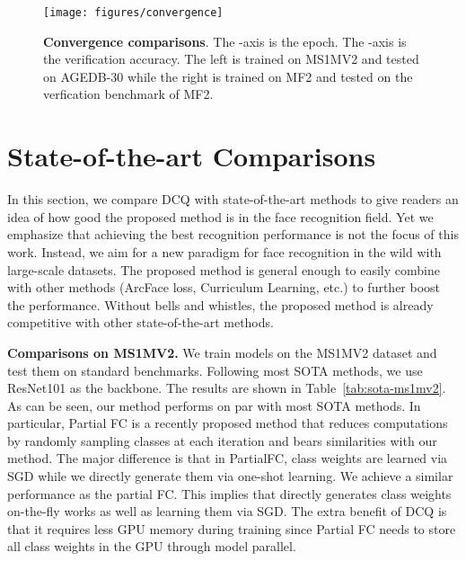 \documentclass[10pt,twocolumn,letterpaper]{article}
\begin{document}
\begin{figure}[h]
   \centering
   \texttt{[image: figures/convergence]}
   \caption{\textbf{Convergence comparisons}. The -axis is the epoch. The -axis is the verification accuracy. The left is trained on MS1MV2 and tested on AGEDB-30 while the right is trained on MF2 and tested on the verfication benchmark of MF2.\label{fig:convergence}}
\end{figure}

\section{State-of-the-art Comparisons}

In this section, we compare DCQ with state-of-the-art methods to give readers an idea of how good the proposed method is in the face recognition field. Yet we emphasize that achieving the best recognition performance is not the focus of this work. Instead, we aim for a new paradigm for face recognition in the wild with large-scale datasets. The proposed method is general enough to easily combine with other methods (ArcFace loss, Curriculum Learning, etc.) to further boost the performance. Without bells and whistles, the proposed method is already competitive with other state-of-the-art methods.

\textbf{Comparisons on MS1MV2.} We train models on the MS1MV2 dataset and test them on standard benchmarks. Following most SOTA methods, we use ResNet101 as the backbone. The results are shown in Table~\ref{tab:sota-ms1mv2}. As can be seen, our method performs on par with most SOTA methods. In particular, Partial FC is a recently proposed method that reduces computations by randomly sampling classes at each iteration and bears similarities with our method. The major difference is that in PartialFC, class weights are learned via SGD while we directly generate them via one-shot learning. We achieve a similar performance as the partial FC. This implies that directly generates class weights on-the-fly works as well as learning them via SGD. The extra benefit of DCQ is that it requires less GPU memory during training since Partial FC needs to store all class weights in the GPU through model parallel.
\end{document}
